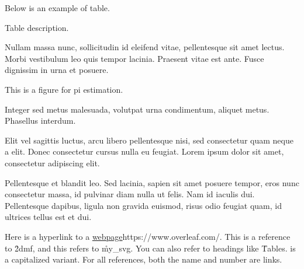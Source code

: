 \documentclass{textbook}
\begin{document}
Below is an example of table.

    {Table description.}

Nullam massa nunc, sollicitudin id eleifend vitae, pellentesque sit amet lectus. Morbi vestibulum leo quis tempor lacinia. Praesent vitae est ante. Fusce dignissim in urna et posuere.

    {This is a figure for pi estimation.}

Integer sed metus malesuada, volutpat urna condimentum, aliquet metus. Phasellus interdum.

Elit vel sagittis luctus, arcu libero pellentesque nisi, sed consectetur quam neque a elit. Donec consectetur cursus nulla eu feugiat. Lorem ipsum dolor sit amet, consectetur adipiscing elit.


Pellentesque et blandit leo. Sed lacinia, sapien sit amet posuere tempor, eros nunc consectetur massa, id pulvinar diam nulla ut felis. Nam id iaculis dui. Pellentesque dapibus, ligula non gravida euismod, risus odio feugiat quam, id ultrices tellus est et dui.

Here is a hyperlink to a \url{webpage}{https://www.overleaf.com/}. This is a reference to \r{2dmf}, and this refers to \r{my_svg}. You can also refer to headings like \r{Tables}.  is a capitalized variant. For all references, both the name and number are links.
\end{document}
